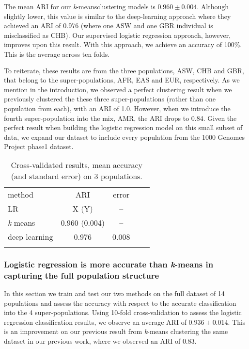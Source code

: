 \documentclass{llncs}
\newcommand{\kMeans}{\textit{k}-means}
\begin{document}
{The mean ARI for our \kMeans clustering models is \(0.960 \pm 0.004 \). Although slightly lower, this value is similar to the deep-learning approach
where they achieved an ARI of 0.976 (where one ASW and one GBR individual is misclassified as CHB). Our supervised logistic regression approach,
however, improves upon this result.  With this approach, we achieve an accuracy of 100\%. This is the average across
ten folds.

To reiterate, these results are from the three populations, ASW, CHB and GBR, that belong to the super-populations, AFR,
EAS and EUR, respectively.  As we mention in the introduction, we observed a perfect clustering result when we previously clustered
the these three super-populations (rather than one population from each), with an ARI of 1.0. However, when
we introduce the fourth super-population into the mix, AMR, the ARI drops to 0.84.  Given the perfect result when building
the logistic regression model on this small subset of data, we expand our dataset to include every population from the
1000 Genomes Project phase1 dataset.


\begin{table}
\caption{Cross-validated results, mean accuracy (and standard error) on 3 populations.}
\begin{center}
\renewcommand{\arraystretch}{1.4}
\setlength\tabcolsep{3pt}
\begin{tabular}{lcccc}
\hline\noalign{\smallskip}
method  & ARI & error \\
LR  & X (Y) & -- \\
\kMeans & 0.960 (0.004) & -- \\
deep learning & 0.976 & 0.008 \\
\noalign{\smallskip}
\hline
\end{tabular}
\end{center}
\end{table}

\subsubsection{Logistic regression is more accurate than \kMeans{} in capturing the full population structure}
In this section we train and test our two methods on the full dataset of 14 populations and assess the accuracy with respect to the accurate
classification into the 4 super-populations.
Using 10-fold cross-validation to assess the logistic regression classification results, we observe an average ARI of \(0.936 \pm{} 0.014\).
This is an improvement on our previous result from \kMeans{} clustering the same dataset in our previous work, where we observed an ARI of \(0.83\).

}
\end{document}
